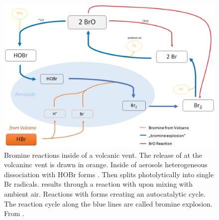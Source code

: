 \documentclass  [
  paper    = a4,
  BCOR     = 10mm,
  twoside,
  fontsize = 12pt,
  fleqn,
  toc      = bibnumbered,
  toc      = listofnumbered,
  numbers  = noendperiod,
  headings = normal,
  listof   = leveldown,
  version  = 3.03
]                                       {scrreprt}
\begin{document}
 
\begin{figure}
	\centering
	\includegraphics[width=0.7\linewidth]{Bilder/Simon/Bilder_Tung/BrO_Explosion}
	\caption{Bromine reactions inside of a volcanic vent. The release of  at the volcaninc vent is drawn  in orange. Inside of aerosols heterogeneous dissociation with HOBr forms . Then  splits photolytically into single Br radicals.   results through a reaction with  upon mixing with ambient air. Reactions with    forms  creating an autocatalytic cycle. The reaction cycle along the blue lines are called bromine explosion. From \citet{WarnachSimon}.}
	\label{fig:broexplosion}
\end{figure}
\end{document}

